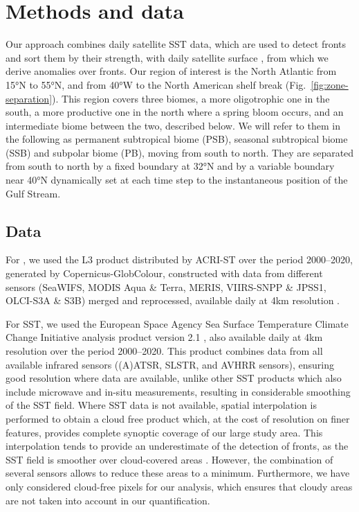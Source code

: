 \section{Methods and data}

Our approach combines daily satellite SST data, which are used to detect fronts and sort them by their strength, with daily satellite surface , from which we derive anomalies over fronts.
Our region of interest is the North Atlantic from 15°N to 55°N, and from 40°W to the North American shelf break (Fig.~\ref{fig:zone-separation}).
This region covers three biomes, a more oligotrophic one in the south, a more productive one in the north where a spring bloom occurs, and an intermediate biome between the two, described below.
We will refer to them in the following as permanent subtropical biome (PSB), seasonal subtropical biome (SSB) and subpolar biome (PB), moving from south to north.
They are separated from south to north by a fixed boundary at 32°N and by a variable boundary near 40°N dynamically set at each time step to the instantaneous position of the Gulf Stream.

\subsection{Data}

For , we used the L3 product distributed by ACRI-ST over the period 2000--2020, generated by Copernicus-GlobColour, constructed with data from different sensors (SeaWIFS, MODIS Aqua \& Terra, MERIS, VIIRS-SNPP \& JPSS1, OLCI-S3A \& S3B) merged and reprocessed, available daily at 4km resolution \citep{chl}.

For SST, we used the European Space Agency Sea Surface Temperature Climate Change Initiative analysis product version 2.1 \citep{merchant_2019, good_2020, sst}, also available daily at 4km resolution over the period 2000--2020.
This product combines data from all available infrared sensors ((A)ATSR, SLSTR, and AVHRR sensors), ensuring good resolution where data are available, unlike other SST products which also include microwave and in-situ measurements, resulting in considerable smoothing of the SST field. %
Where SST data is not available, spatial interpolation is performed to obtain a cloud free product which, at the cost of resolution on finer features, provides complete synoptic coverage of our large study area.
This interpolation tends to provide an underestimate of the detection of fronts, as the SST field is smoother over cloud-covered areas \citep{merchant_2019}.
However, the combination of several sensors allows to reduce these areas to a minimum.
Furthermore, we have only considered cloud-free pixels for our analysis, which ensures that cloudy areas are not taken into account in our quantification.


